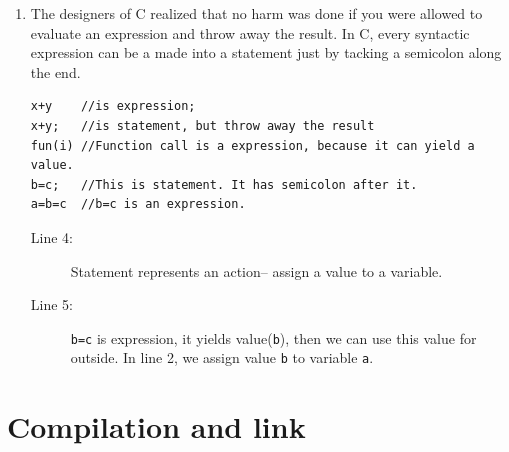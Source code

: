 \documentclass[a4paper,11pt,twoside]{book}
\begin{document}
\begin{itemize}
\begin{enumerate}
		\item The designers of C realized that no harm was done if you were allowed to evaluate an expression and throw away the result. In C, every syntactic expression can be a made into a statement just by tacking a semicolon along the end.
	
\begin{lstlisting}[]
x+y    //is expression;
x+y;   //is statement, but throw away the result
fun(i) //Function call is a expression, because it can yield a value.
b=c;   //This is statement. It has semicolon after it.
a=b=c  //b=c is an expression. 
\end{lstlisting} 
\begin{description}
	\item[Line 4:]  Statement represents an action-- assign a value to a variable.
	\item[Line 5:] \texttt{b=c} is expression, it yields value(\texttt{b}), then we can use this value for outside. In line 2, we assign value \texttt{b} to variable \texttt{a}. 
\end{description}
\end{enumerate}

\end{itemize}

\section{Compilation and link}
\end{document}
